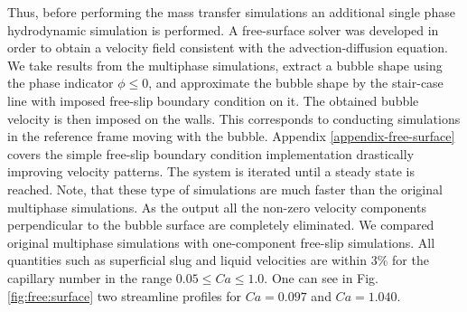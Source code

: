 \documentclass[preprint,12pt]{elsarticle}
\begin{document}
\begin{description}
Thus, before performing the mass transfer simulations an additional single phase hydrodynamic
simulation is performed. A free-surface solver was developed in order to obtain a velocity field
consistent with the advection-diffusion equation. We take results from the
multiphase simulations, extract a
bubble shape using the phase indicator $\phi\leq0$, and approximate the bubble shape by the stair-case
line with imposed free-slip boundary condition on it. The obtained bubble velocity is then imposed on the walls. This corresponds to conducting 
simulations in the reference frame moving with the bubble. Appendix \ref{appendix-free-surface} covers the simple
free-slip boundary condition implementation drastically improving velocity patterns. The system is
iterated until a
steady state is reached. Note, that these type of simulations are much faster than the original
multiphase simulations. As the output all the non-zero velocity components perpendicular to the
bubble surface are completely eliminated. We compared original multiphase simulations with
one-component free-slip simulations. All quantities such as superficial slug and liquid velocities are
within $3\%$ for the capillary number in the range $0.05\leq Ca \leq 1.0$. 
One can see in Fig. \ref{fig:free:surface} two streamline profiles for $Ca=0.097$  and $Ca=1.040$.
\begin{figure}[htb!]

\end{figure}
\end{description}
\end{document}
